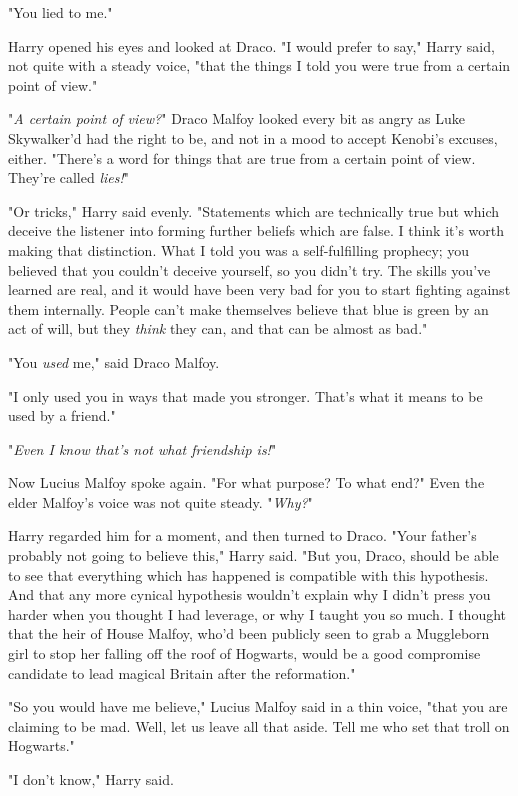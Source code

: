 "You lied to me."

Harry opened his eyes and looked at Draco. "I would prefer to say," Harry said,
not quite with a steady voice, "that the things I told you were true from a
certain point of view."

"\emph{A certain point of view?}" Draco Malfoy looked every bit as angry as
Luke Skywalker'd had the right to be, and not in a mood to accept Kenobi's
excuses, either. "There's a word for things that are true from a certain point
of view. They're called \emph{lies!}"

"Or tricks," Harry said evenly. "Statements which are technically true but
which deceive the listener into forming further beliefs which are false. I
think it's worth making that distinction. What I told you was a self-fulfilling
prophecy; you believed that you couldn't deceive yourself, so you didn't try.
The skills you've learned are real, and it would have been very bad for you to
start fighting against them internally. People can't make themselves believe
that blue is green by an act of will, but they \emph{think} they can, and that
can be almost as bad."

"You \emph{used} me," said Draco Malfoy.

"I only used you in ways that made you stronger. That's what it means to be
used by a friend."

"\emph{Even I know that's not what friendship is!}"

Now Lucius Malfoy spoke again. "For what purpose? To what end?" Even the elder
Malfoy's voice was not quite steady. "\emph{Why?}"

Harry regarded him for a moment, and then turned to Draco. "Your father's
probably not going to believe this," Harry said. "But you, Draco, should be
able to see that everything which has happened is compatible with this
hypothesis. And that any more cynical hypothesis wouldn't explain why I didn't
press you harder when you thought I had leverage, or why I taught you so much.
I thought that the heir of House Malfoy, who'd been publicly seen to grab a
Muggleborn girl to stop her falling off the roof of Hogwarts, would be a good
compromise candidate to lead magical Britain after the reformation."

"So you would have me believe," Lucius Malfoy said in a thin voice, "that you
are claiming to be mad. Well, let us leave all that aside. Tell me who set that
troll on Hogwarts."

"I don't know," Harry said.

